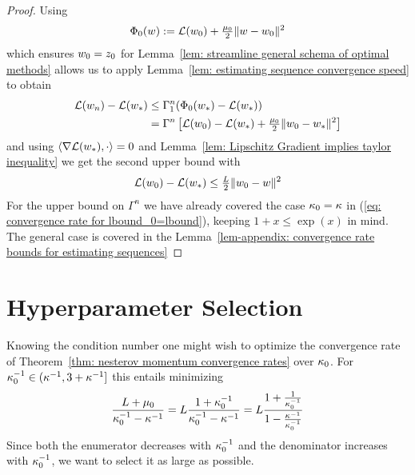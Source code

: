 \begin{proof}
	Using
	\begin{align*}
		\Phi_0(w) := \mathcal{L}(w_0) + \tfrac{\mu_0}{2}\|w -w_0\|^2
	\end{align*}
	which ensures \(w_0=z_0\) for Lemma~\ref{lem: streamline general
	schema of optimal methods} allows us to apply Lemma~\ref{lem: estimating
	sequence convergence speed} to obtain
	\begin{align*}
		\mathcal{L}(w_n)-\mathcal{L}(w_*)
		&\le \Gamma_1^n(\Phi_0(w_*)-\mathcal{L}(w_*))\\
		&= \Gamma^n\left[
			\mathcal{L}(w_0) -\mathcal{L}(w_*)
			+ \tfrac{\mu_0}2\|w_0-w_*\|^2
		\right]
	\end{align*}	
	and using \(\langle \nabla\mathcal{L}(w_*), \cdot\rangle = 0\) and
	Lemma~\ref{lem: Lipschitz Gradient implies taylor inequality} we get the
	second upper bound with
	\begin{align*}
		\mathcal{L}(w_0)-\mathcal{L}(w_*)\le \tfrac{L}{2}\|w_0-w\|^2
	\end{align*}
	For the upper bound on \(\Gamma^n\) we have already covered the case
	\(\kappa_0=\kappa\) in (\ref{eq: convergence rate for lbound_0=lbound}),
	keeping \(1+x\le\exp(x)\) in mind. The general case is covered in the
	Lemma~\ref{lem-appendix: convergence rate bounds for estimating sequences}
\end{proof}

\section{Hyperparameter Selection}

Knowing the condition number one might wish to optimize the convergence rate
of Theorem~\ref{thm: nesterov momentum convergence rates} over \(\kappa_0\).
For \(\kappa_0^{-1}\in(\kappa^{-1}, 3+\kappa^{-1}]\) this entails
minimizing
\begin{align}\label{eq: convergence rate optimization}
	\frac{L+\mu_0}{\kappa_0^{-1}-\kappa^{-1}}
	= L \frac{1+\kappa_0^{-1}}{\kappa_0^{-1}-\kappa^{-1}}
	= L \frac{1+\frac{1}{\kappa_0^{-1}}}{1-\frac{\kappa^{-1}}{\kappa_0^{-1}}}
\end{align}
Since both the enumerator decreases with \(\kappa_0^{-1}\) and the
denominator increases with \(\kappa_0^{-1}\), we want to select it as large
as possible.

